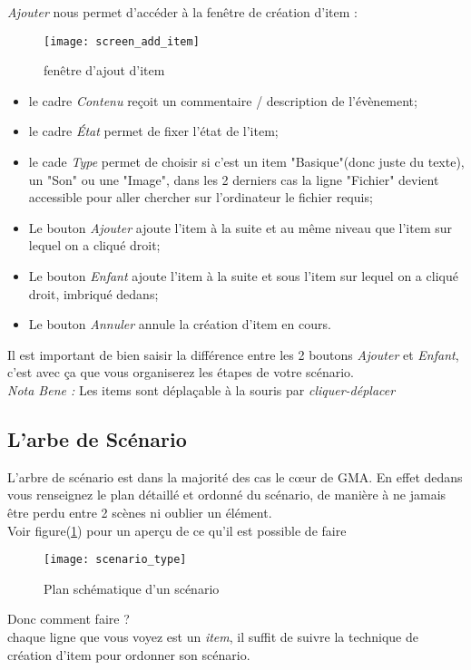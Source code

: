 \documentclass[a4paper,12pt]{article}
\begin{document}
\emph{Ajouter} nous permet d'accéder à la fenêtre de création d'item :
\begin{figure}[h]
    \texttt{[image: screen\_add\_item]}
    \caption{fenêtre d'ajout d'item}
\end{figure}
\begin{itemize}
    \item le cadre \emph{Contenu} reçoit un commentaire / description de l'évènement;
    \item le cadre \emph{État} permet de fixer l'état de l'item;
    \item le cade \emph{Type} permet de choisir si c'est un item "Basique"(donc juste du texte), un "Son" ou une "Image", dans les 2 derniers cas la ligne "Fichier" devient accessible pour aller chercher sur l'ordinateur le fichier requis;
    \item Le bouton \emph{Ajouter} ajoute l'item à la suite et au même niveau que l'item sur lequel on a cliqué droit;
    \item Le bouton \emph{Enfant} ajoute l'item à la suite et sous l'item sur lequel on a cliqué droit, imbriqué dedans;
    \item Le bouton \emph{Annuler} annule la création d'item en cours.
\end{itemize}

Il est important de bien saisir la différence entre les 2 boutons \emph{Ajouter} et \emph{Enfant}, c'est avec ça que vous organiserez les étapes de votre scénario.
\\
\emph{Nota Bene :} Les items sont déplaçable à la souris par \emph{cliquer-déplacer}

\subsection{L'arbe de Scénario}\label{scenario}
L'arbre de scénario est dans la majorité des cas le cœur de GMA. En effet dedans vous renseignez le plan détaillé et ordonné du scénario, de manière à ne jamais être perdu entre 2 scènes ni oublier un élément.
\\
Voir figure(\ref{arbre_scenar}) pour un aperçu de ce qu'il est possible de faire
\begin{figure}[h]
    \texttt{[image: scenario\_type]}
    \caption{Plan schématique d'un scénario}
    \label{arbre_scenar}
\end{figure}
Donc comment faire ?
\\
chaque ligne que vous voyez est un \emph{item}, il suffit de suivre la technique de création d'item pour ordonner son scénario.
\end{document}

